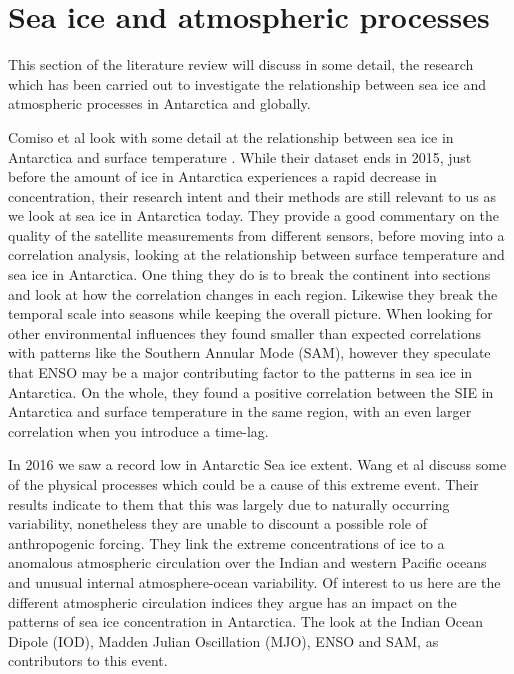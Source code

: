 \section{Sea ice and atmospheric processes}
This section of the literature review will discuss in some detail, the research which has been carried out to investigate the relationship between sea ice and atmospheric processes in Antarctica and globally.

Comiso et al look with some detail at the relationship between sea ice in Antarctica and surface temperature \cite{ComisoPositiveTemperature}. While their dataset ends in 2015, just before the amount of ice in Antarctica experiences a rapid decrease in concentration, their research intent and their methods are still relevant to us as we look at sea ice in Antarctica today. They provide a good commentary on the quality of the satellite measurements from different sensors, before moving into a correlation analysis, looking at the relationship between surface temperature and sea ice in Antarctica. One thing they do is to break the continent into sections and look at how the correlation changes in each region. Likewise they break the temporal scale into seasons while keeping the overall picture. When looking for other environmental influences they found smaller than expected correlations with patterns like the Southern Annular Mode (SAM), however they speculate that ENSO may be a major contributing factor to the patterns in sea ice in Antarctica. On the whole, they found a positive correlation between the SIE in Antarctica and surface temperature in the same region, with an even larger correlation when you introduce a time-lag. 

In 2016 we saw a record low in Antarctic Sea ice extent. Wang et al \cite{Wang2019Compounding2016} discuss some of the physical processes which could be a cause of this extreme event. Their results indicate to them that this was largely due to naturally occurring variability, nonetheless they are unable to discount a possible role of anthropogenic forcing. They link the extreme concentrations of ice to a anomalous atmospheric circulation over the Indian and western Pacific oceans and unusual internal atmosphere-ocean variability. Of interest to us here are the different atmospheric circulation indices they argue has an impact on the patterns of sea ice concentration in Antarctica. The look at the Indian Ocean Dipole (IOD), Madden Julian Oscillation (MJO), ENSO and SAM, as contributors to this event.


